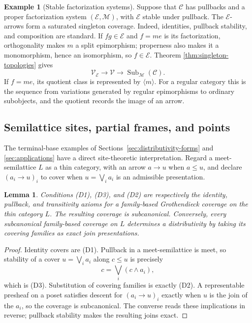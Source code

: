 \documentclass[12pt,oneside,reqno]{amsart}
\newtheorem{lemma}[theorem]{Lemma}
\theoremstyle{definition}
\newtheorem{example}[theorem]{Example}
\theoremstyle{remark}
\newcommand{\C}{\mathcal C}
\newcommand{\Var}{\mathscr V}
\newcommand{\prin}[1]{\langle #1\rangle}
\begin{document}
\begin{example}[Stable factorization systems]
Suppose that \(\C\) has pullbacks and a proper factorization system
\((\mathcal E,\mathcal M)\), with \(\mathcal E\) stable under
pullback.  The \(\mathcal E\)-arrows form a saturated singleton
coverage.  Indeed, identities, pullback stability, and composition are
standard.  If \(fg\in\mathcal E\) and \(f=me\) is its factorization,
orthogonality makes \(m\) a split epimorphism; properness also makes it
a monomorphism, hence an isomorphism, so \(f\in\mathcal E\).  Theorem
\ref{thm:singleton-topologies} gives
\[
 \Var_{\mathcal E}\longrightarrow\Var
 \longrightarrow\operatorname{Sub}_{\mathcal M}(\C)
 .
\]
If \(f=me\), its quotient class is represented by \(\prin m\).  For a
regular category this is the sequence from variations generated by
regular epimorphisms to ordinary subobjects, and the quotient records
the image of an arrow.
\end{example}

\subsection{Semilattice sites, partial frames, and points}

The terminal-base examples of Sections~\ref{sec:distributivity-forms}
and \ref{sec:applications} have a direct site-theoretic interpretation.
Regard a meet-semilattice \(L\) as a thin category, with an arrow
\(a\to u\) when \(a\leqslant u\), and declare
\((a_i\to u)_i\) to cover when \(u=\bigvee_i a_i\) is an admissible
presentation.

\begin{lemma}\label{lem:semilattice-sites}
Conditions (D1), (D3), and (D2) are respectively the identity,
pullback, and transitivity axioms for a family-based Grothendieck
coverage on the thin category \(L\).  The resulting coverage is
subcanonical.  Conversely, every subcanonical family-based coverage on
\(L\) determines a distributivity by taking its covering families as
exact join presentations.
\end{lemma}

\begin{proof}
Identity covers are (D1).  Pullback in a meet-semilattice is meet, so
stability of a cover \(u=\bigvee_i a_i\) along \(c\leqslant u\) is
precisely
\[
                         c=\bigvee_i(c\wedge a_i),
\]
which is (D3).  Substitution of covering families is exactly (D2).
A representable presheaf on a poset satisfies descent for
\((a_i\to u)_i\) exactly when \(u\) is the join of the \(a_i\), so the
coverage is subcanonical.  The converse reads these implications in
reverse; pullback stability makes the resulting joins exact.
\end{proof}
\end{document}
